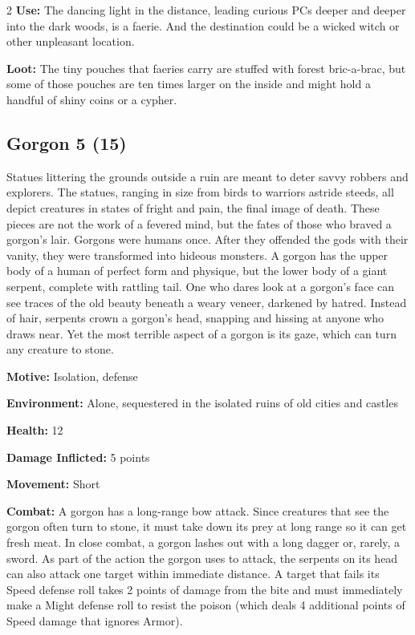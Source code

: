 \begin{multicols}{2}
\textbf{Use:} The dancing light in the distance, leading curious PCs deeper and deeper into the dark woods, is a faerie. And the destination could be a wicked witch or other unpleasant location.

\textbf{Loot:} The tiny pouches that faeries carry are stuffed with forest bric-a-brac, but some of those pouches are ten times larger on the inside and might hold a handful of shiny coins or a cypher.

\subsection{Gorgon 5 (15)}

Statues littering the grounds outside a ruin are meant to deter savvy robbers and explorers. The statues, ranging in size from birds to warriors astride steeds, all depict creatures in states of fright and pain, the final image of death. These pieces are not the work of a fevered mind, but the fates of those who braved a gorgon’s lair. Gorgons were humans once. After they offended the gods with their vanity, they were transformed into hideous monsters. A gorgon has the upper body of a human of perfect form and physique, but the lower body of a giant serpent, complete with rattling tail. One who dares look at a gorgon’s face can see traces of the old beauty beneath a weary veneer, darkened by hatred. Instead of hair, serpents crown a gorgon’s head, snapping and hissing at anyone who draws near. Yet the most terrible aspect of a gorgon is its gaze, which can turn any creature to stone. 

\textbf{Motive:} Isolation, defense 

\textbf{Environment:} Alone, sequestered in the isolated ruins of old cities and castles 

\textbf{Health:} 12 

\textbf{Damage Inflicted:} 5 points 

\textbf{Movement:} Short 

\textbf{Combat:} A gorgon has a long-range bow attack. Since creatures that see the gorgon often turn to stone, it must take down its prey at long range so it can get fresh meat. In close combat, a gorgon lashes out with a long dagger or, rarely, a sword. As part of the action the gorgon uses to attack, the serpents on its head can also attack one target within immediate distance. A target that fails its Speed defense roll takes 2 points of damage from the bite and must immediately make a Might defense roll to resist the poison (which deals 4 additional points of Speed damage that ignores Armor). 


\end{multicols}

